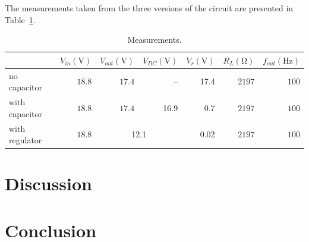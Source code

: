 \documentclass[12pt]{article}
\begin{document}
The measurements taken from the three versions of the circuit are presented in Table~\ref{tab:imp}.
\begin{table}[h!]
\centering
\caption{Measurements.}  
\begin{tabular}{|l|r|r|r|r|r|r|}
\hline
&$V_{in}(\mathrm{V})$&$V_{out}(\mathrm{V})$&$V_{DC}(\mathrm{V})$&$V_{r}(\mathrm{V})$&$R_{L}(\mathrm{\Omega})$&$f_{out}(\mathrm{Hz})$\\ \hline
no capacitor&$18.8$&$17.4$&--&17.4&$2197$&$100$\\ \hline
with capacitor&$18.8$&$17.4$&16.9&0.7&$2197$&$100$\\ \hline
with regulator&$18.8$&\multicolumn{2}{|c|}{12.1}&0.02&$2197$&$100$\\ \hline
\end{tabular}
\label{tab:imp}
\end{table}

\section{Discussion}
\label{sec:dis}
\section{Conclusion}
\label{sec:con}

\end{document}
